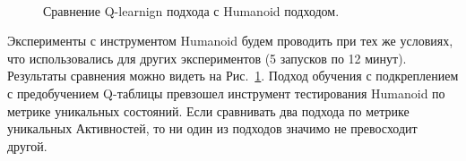 \begin{figure}[h]
 \\
\caption{Сравнение Q-learnign подхода с Humanoid подходом.}
\label{Humanoid}
\end{figure}

Эксперименты с инструментом Humanoid будем проводить при тех же условиях, что использовались для других экспериментов (5 запусков по 12 минут). Результаты сравнения можно видеть на Рис.~\ref{Humanoid}. Подход обучения с подкреплением с предобучением Q-таблицы превзошел инструмент тестирования Humanoid по метрике уникальных состояний. Если сравнивать два подхода по метрике уникальных Активностей, то ни один из подходов значимо не превосходит другой.